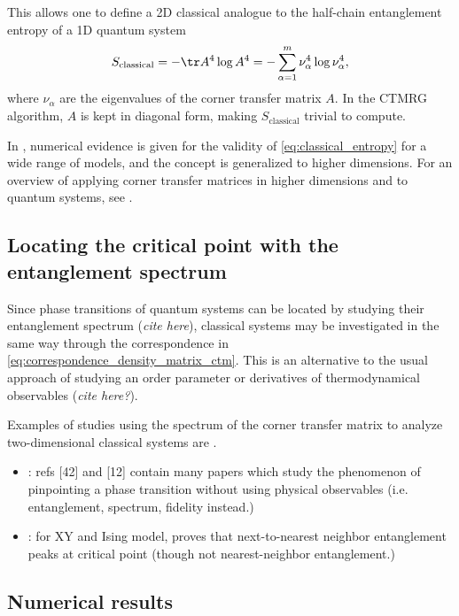 This allows one to define a 2D classical analogue to the half-chain entanglement entropy of a 1D quantum system
\begin{equation}\label{eq:classical_entropy}
  S_{\text{classical}} = - \tr A^4 \log A^4 = - \sum_{\alpha=1}^{m} \nu_{\alpha}^4 \log \nu_{\alpha}^4,
\end{equation}
where $\nu_{\alpha}$ are the eigenvalues of the corner transfer matrix $A$.
In the CTMRG algorithm, $A$ is kept in diagonal form, making $S_{\text{classical}}$ trivial to compute.

In \cite{huang2017holographic}, numerical evidence is given for the validity of \autoref{eq:classical_entropy} for a
wide range of models, and the concept is generalized to higher dimensions. For an overview of applying corner transfer
matrices in higher dimensions and to quantum systems, see \cite{orus2012exploring}.

\subsection{Locating the critical point with the entanglement spectrum}
Since phase transitions of quantum systems can be located by studying their entanglement spectrum (\emph{cite here}),
classical systems may be investigated in the same way through the correspondence in
\autoref{eq:correspondence_density_matrix_ctm}. This is an alternative to the usual approach of studying an order
parameter or derivatives of thermodynamical observables (\emph{cite here?}).

Examples of studies using the spectrum of the corner transfer matrix to analyze two-dimensional classical systems are
\cite{krvcmar2015reentrant, PhysRevE.94.022134, krvcmar2016phase}.


\begin{itemize}
  \item \cite{huang2017holographic}: refs [42] and [12] contain many papers which study the phenomenon of pinpointing
  a phase transition without using physical observables (i.e. entanglement, spectrum, fidelity instead.)
  \item \cite{osborne2002entanglement}: for XY and Ising model, proves that next-to-nearest neighbor entanglement peaks
  at critical point (though not nearest-neighbor entanglement.)
\end{itemize}


\subsection{Numerical results}

